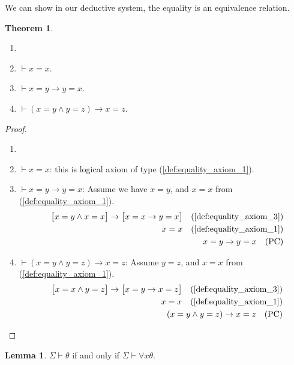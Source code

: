 \documentclass[11pt,letterpaper]{book}
\theoremstyle{definition}
\newtheorem{theorem}{Theorem}[section]
\newtheorem{lemma}{Lemma}[section]
\begin{document}
We can show in our deductive system, the equality is an equivalence
relation.


\begin{theorem}\label{theorem:equality_equiv_relation}
\begin{enumerate}
\item[]
\item{ $\vdash x = x $.}
\item{$\vdash x = y \rightarrow y = x$.}
\item{$\vdash (x=y \land y = z) \rightarrow x = z $.}
\end{enumerate}
\end{theorem}

\begin{proof}
\begin{enumerate}
\item[]
\item{$\vdash x = x $: this is logical axiom of type
(\ref{def:equality_axiom_1}).}
\item{$\vdash x = y \rightarrow y = x$: Assume we have $x=y$, and $x=x$
from (\ref{def:equality_axiom_1}).
\begin{eqnarray*}
& & \big[ x=y \land x=x \big] \rightarrow \big[x=x \rightarrow y = x
\big] \quad \text{(\ref{def:equality_axiom_3})} \\
& & x =x \quad \text{(\ref{def:equality_axiom_1})} \\
& & x=y \rightarrow y =x \quad \text{(PC)}
\end{eqnarray*}
}
\item{$\vdash (x=y \land y = z) \rightarrow x = z $: Assume $y=z$, and
$x=x$ from (\ref{def:equality_axiom_1}).
\begin{eqnarray*}
& & \big[ x=x \land y=z \big] \rightarrow \big[x=y \rightarrow x = z
\big] \quad \text{(\ref{def:equality_axiom_3})} \\
& & x =x \quad \text{(\ref{def:equality_axiom_1})} \\
& & (x=y \land y = z ) \rightarrow x = z \quad \text{(PC)}
\end{eqnarray*}
}
\end{enumerate}
\end{proof}

\begin{lemma}\label{lemma:deduce_to_forall}
$\Sigma \vdash \theta$ if and only if $\Sigma \vdash \forall x \theta$.
\end{lemma}
\end{document}
